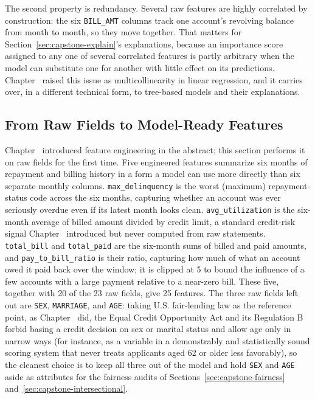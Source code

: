 \documentclass[../ai_in_finance]{subfiles}
\begin{document}
The second property is redundancy. Several raw features are highly correlated by construction: the six \texttt{BILL\_AMT} columns track one account's revolving balance from month to month, so they move together. That matters for Section~\ref{sec:capstone-explain}'s explanations, because an importance score assigned to any one of several correlated features is partly arbitrary when the model can substitute one for another with little effect on its predictions. Chapter~ raised this issue as multicollinearity in linear regression, and it carries over, in a different technical form, to tree-based models and their explanations.

\subsection{From Raw Fields to Model-Ready Features}
\label{sec:capstone-features}

Chapter~ introduced feature engineering in the abstract; this section performs it on raw fields for the first time. Five engineered features summarize six months of repayment and billing history in a form a model can use more directly than six separate monthly columns. \texttt{max\_\allowbreak delinquency} is the worst (maximum) repayment-status code across the six months, capturing whether an account was ever seriously overdue even if its latest month looks clean. \texttt{avg\_utilization} is the six-month average of billed amount divided by credit limit, a standard credit-risk signal Chapter~ introduced but never computed from raw statements. \texttt{total\_bill} and \texttt{total\_paid} are the six-month sums of billed and paid amounts, and \texttt{pay\_to\_bill\_ratio} is their ratio, capturing how much of what an account owed it paid back over the window; it is clipped at 5 to bound the influence of a few accounts with a large payment relative to a near-zero bill. These five, together with 20 of the 23 raw fields, give 25 features. The three raw fields left out are \texttt{SEX}, \texttt{MARRIAGE}, and \texttt{AGE}: taking U.S. fair-lending law as the reference point, as Chapter~ did, the Equal Credit Opportunity Act and its Regulation B forbid basing a credit decision on sex or marital status and allow age only in narrow ways (for instance, as a variable in a demonstrably and statistically sound scoring system that never treats applicants aged 62 or older less favorably), so the cleanest choice is to keep all three out of the model and hold \texttt{SEX} and \texttt{AGE} aside as attributes for the fairness audits of Sections~\ref{sec:capstone-fairness} and~\ref{sec:capstone-intersectional}.
\end{document}
